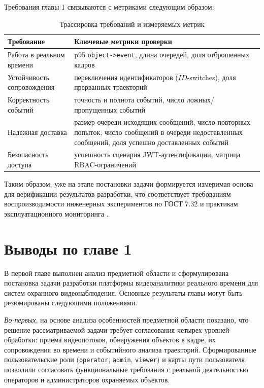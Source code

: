 Требования главы 1 связываются с метриками следующим образом:
\begin{table}[H]
\caption{Трассировка требований и измеряемых метрик}
\label{tab:req_metrics_traceability}
\begin{tabularx}{\textwidth}{>{\raggedright\arraybackslash}p{}X}
\toprule
Требование & Ключевые метрики проверки \\
\midrule
Работа в реальном времени & p95 \texttt{object->event}, длина очередей, доля отброшенных кадров \\
Устойчивость сопровождения & переключения идентификаторов (\(ID\)-switches), доля прерванных траекторий \\
Корректность событий & точность и полнота событий, число ложных/пропущенных событий \\
Надежная доставка & размер очереди исходящих сообщений, число повторных попыток, число сообщений в очереди недоставленных сообщений, доля успешно доставленных событий \\
Безопасность доступа & успешность сценария JWT-аутентификации, матрица RBAC-ограничений \\
\bottomrule
\end{tabularx}
\end{table}

Таким образом, уже на этапе постановки задачи формируется измеримая основа для верификации результатов разработки, что соответствует требованиям воспроизводимости инженерных экспериментов по ГОСТ 7.32 \cite{gost_732_2017} и практикам эксплуатационного мониторинга \cite{prometheus_docs,grafana_docs}.

\section*{Выводы по главе 1}

В первой главе выполнен анализ предметной области и сформулирована постановка задачи разработки платформы видеоаналитики реального времени для систем охранного видеонаблюдения. Основные результаты главы могут быть резюмированы следующими положениями.

\textit{Во-первых}, на основе анализа особенностей предметной области показано, что решение рассматриваемой задачи требует согласования четырех уровней обработки: приема видеопотоков, обнаружения объектов в кадре, их сопровождения во времени и событийного анализа траекторий. Сформированные пользовательские роли (\texttt{operator}, \texttt{admin}, \texttt{viewer}) и карты пути пользователя позволили согласовать функциональные требования с реальной деятельностью операторов и администраторов охраняемых объектов.

